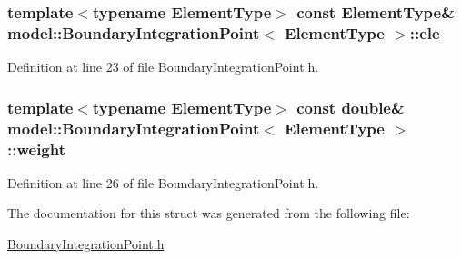 \subsubsection[{ele}]{\setlength{\rightskip}{0pt plus 5cm}template$<$typename Element\+Type$>$ const Element\+Type\& {\bf model\+::\+Boundary\+Integration\+Point}$<$ Element\+Type $>$\+::ele}\label{structmodel_1_1_boundary_integration_point_a69c5801f95a18a2c3c9bc21bff580a56}


Definition at line 23 of file Boundary\+Integration\+Point.\+h.

\hypertarget{structmodel_1_1_boundary_integration_point_a5228be239c0d05260d94cb2b5f3832e5}{}
\subsubsection[{weight}]{\setlength{\rightskip}{0pt plus 5cm}template$<$typename Element\+Type$>$ const double\& {\bf model\+::\+Boundary\+Integration\+Point}$<$ Element\+Type $>$\+::weight}\label{structmodel_1_1_boundary_integration_point_a5228be239c0d05260d94cb2b5f3832e5}


Definition at line 26 of file Boundary\+Integration\+Point.\+h.



The documentation for this struct was generated from the following file\+:\begin{DoxyCompactItemize}
\item 
\hyperlink{_boundary_integration_point_8h}{Boundary\+Integration\+Point.\+h}\end{DoxyCompactItemize}
